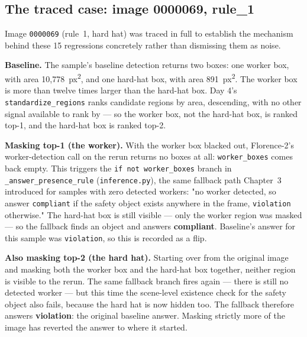 \subsection{The traced case: image 0000069, rule\_1}

Image \texttt{0000069} (rule~1, hard hat) was traced in full to establish the mechanism behind these
15 regressions concretely rather than dismissing them as noise.

\textbf{Baseline.} The sample's baseline detection returns two boxes: one worker box, with area
10{,}778~px\textsuperscript{2}, and one hard-hat box, with area 891~px\textsuperscript{2}. The worker
box is more than twelve times larger than the hard-hat box. Day 4's \texttt{standardize\_regions}
ranks candidate regions by area, descending, with no other signal available to rank by --- so the
worker box, not the hard-hat box, is ranked top-1, and the hard-hat box is ranked top-2.

\textbf{Masking top-1 (the worker).} With the worker box blacked out, Florence-2's worker-detection
call on the rerun returns no boxes at all: \texttt{worker\_boxes} comes back empty. This triggers the
\texttt{if not worker\_boxes} branch in \texttt{\_answer\_presence\_rule}
(\texttt{inference.py}), the same fallback path Chapter~3 introduced for samples with zero detected
workers: "no worker detected, so answer \texttt{compliant} if the safety object exists anywhere in the
frame, \texttt{violation} otherwise." The hard-hat box is still visible --- only the worker region was
masked --- so the fallback finds an object and answers \textbf{compliant}. Baseline's answer for this
sample was \texttt{violation}, so this is recorded as a flip.

\textbf{Also masking top-2 (the hard hat).} Starting over from the original image and masking both
the worker box and the hard-hat box together, neither region is visible to the rerun. The same
fallback branch fires again --- there is still no detected worker --- but this time the scene-level
existence check for the safety object also fails, because the hard hat is now hidden too. The fallback
therefore answers \textbf{violation}: the original baseline answer. Masking strictly more of the image
has reverted the answer to where it started.

